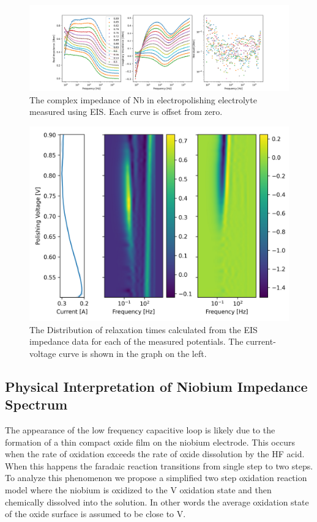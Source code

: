 \documentclass[11pt]{article}
\begin{document}
\begin{figure}
  \label{fig:bodeplot}
  \includegraphics[]{figures/bodeplot.png}
  \caption{The complex impedance of Nb in electropolishing electrolyte measured using EIS. Each curve is offset from zero.}
\end{figure}

\begin{figure}
  \label{fig:gamma}
  \includegraphics[]{figures/gamma.png}  
  \caption{The Distribution of relaxation times calculated from the EIS impedance data for each of the measured potentials. The current-voltage curve is shown in the graph on the left.}
\end{figure}





\subsection{Physical Interpretation of Niobium Impedance Spectrum}

The appearance of the low frequency capacitive loop is likely due to the formation of a thin compact oxide film on the niobium electrode. This occurs when the rate of oxidation exceeds the rate of oxide dissolution by the HF acid. When this happens the faradaic reaction transitions from single step to two steps. To analyze this phenomenon we propose a simplified two step oxidation reaction model where the niobium is oxidized to the V oxidation state and then chemically dissolved into the solution. In other words the average oxidation state of the oxide surface is assumed to be close to V.
\end{document}
